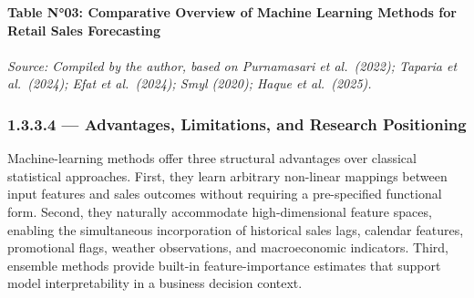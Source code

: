\begin{table}[h!]
\centering
{\bfseries Table N°03: Comparative Overview of Machine Learning Methods
for Retail Sales Forecasting}\\[6pt]
\renewcommand{\arraystretch}{1.65}
\\[5pt]
{\small\textit{Source: Compiled by the author, based on Purnamasari et al.\
(2022); Taparia et al.\ (2024); Efat et al.\ (2024); Smyl (2020);
Haque et al.\ (2025).}}
\label{tab:03}
\end{table}

\subsubsection{1.3.3.4 — Advantages, Limitations, and Research Positioning}

Machine-learning methods offer three structural advantages over classical
statistical approaches. First, they learn arbitrary non-linear mappings
between input features and sales outcomes without requiring a pre-specified
functional form. Second, they naturally accommodate high-dimensional feature
spaces, enabling the simultaneous incorporation of historical sales lags,
calendar features, promotional flags, weather observations, and
macroeconomic indicators. Third, ensemble methods provide built-in
feature-importance estimates that support model interpretability in a
business decision context.

